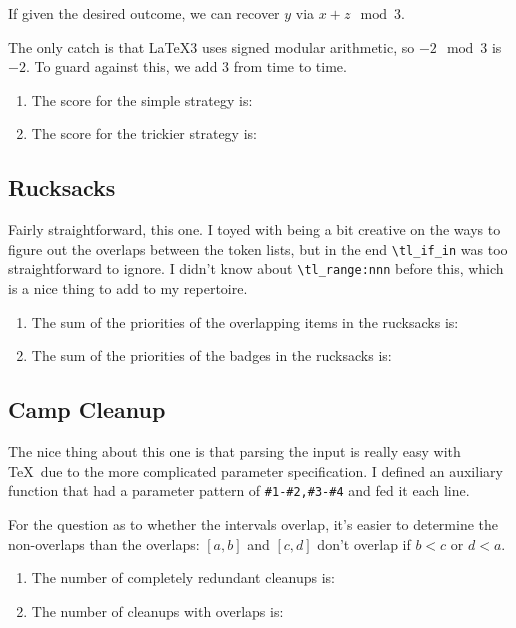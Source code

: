 \documentclass{article}
\begin{document}
If given the desired outcome, we can recover \(y\) via \(x + z \mod 3\).

The only catch is that \LaTeX3 uses signed modular arithmetic, so \(-2 \mod 3\) is \(-2\).
To guard against this, we add \(3\) from time to time.

\begin{enumerate}
\item The score for the simple strategy is: 
\item The score for the trickier strategy is: 
\end{enumerate}

\subsection{Rucksacks}

Fairly straightforward, this one.
I toyed with being a bit creative on the ways to figure out the overlaps between the token lists, but in the end \Verb!\tl_if_in! was too straightforward to ignore.
I didn't know about \Verb!\tl_range:nnn! before this, which is a nice thing to add to my repertoire.

\begin{enumerate}
\item The sum of the priorities of the overlapping items in the rucksacks is: 
\item The sum of the priorities of the badges in the rucksacks is: 
\end{enumerate}

\subsection{Camp Cleanup}

The nice thing about this one is that parsing the input is really easy with \TeX\ due to the more complicated parameter specification.
I defined an auxiliary function that had a parameter pattern of \Verb!#1-#2,#3-#4! and fed it each line.

For the question as to whether the intervals overlap, it's easier to determine the non-overlaps than the overlaps: \([a,b]\) and \([c,d]\) don't overlap if \(b < c\) or \(d < a\).

\begin{enumerate}
\item The number of completely redundant cleanups is: 
\item The number of cleanups with overlaps is: 
\end{enumerate}
\end{document}
